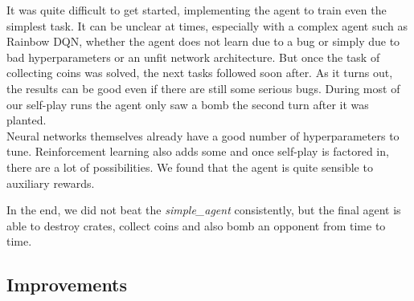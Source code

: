

It was quite difficult to get started, implementing the agent to train even the simplest task. It can be unclear at times, especially with a complex agent such as Rainbow DQN, whether the agent does not learn due to a bug or simply due to bad hyperparameters or an unfit network architecture. But once the task of collecting coins was solved, the next tasks followed soon after. As it turns out, the results can be good even if there are still some serious bugs. During most of our self-play runs the agent only saw a bomb the second turn after it was planted.\\
Neural networks themselves already have a good number of hyperparameters to tune. Reinforcement learning also adds some and once self-play is factored in, there are a lot of possibilities. We found that the agent is quite sensible to auxiliary rewards.

In the end, we did not beat the \emph{simple\_agent} consistently, but the final agent is able to destroy crates, collect coins and also bomb an opponent from time to time.

\subsection{Improvements\johannes}

